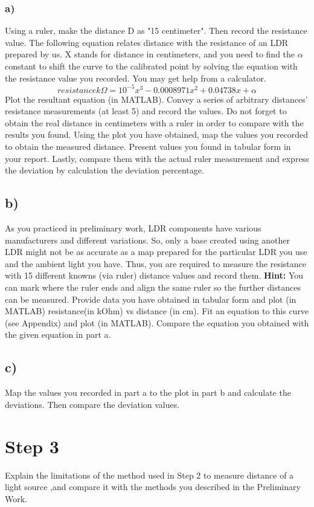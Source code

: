 \documentclass[letterpaper,12pt]{article}
\begin{document}
\subsubsection*{a)}
Using a ruler, make the distance D as "15 centimeter". Then record the resistance value. The following equation relates distance with the resistance of an LDR prepared by us. X stands for distance in centimeters, and you need to find the \(\alpha\) constant to shift the curve to the calibrated point by solving the equation with the resistance value you recorded. You may get help from a calculator.
\[resistance   k\Omega = 10^{-5} x^3 -0.0008971 x^2 + 0.04738x + \alpha\] 
Plot the resultant equation (in MATLAB). Convey a series of arbitrary distances' resistance measurements (at least 5) and record the values. Do not forget to obtain the real distance in centimeters with a ruler in order to compare with the results you found. Using the plot you have obtained, map the values you recorded to obtain the measured distance. Present values you found in tabular form in your report. Lastly, compare them with the actual ruler measurement and express the deviation by calculation the deviation percentage.\\
\subsection*{b)}
As you practiced in preliminary work, LDR components have various manufacturers and different variations. So, only a base created using another LDR might not be as accurate as a map prepared for the particular LDR you use and the ambient light you have. Thus, you are required to measure the resistance with 15 different knowns (via ruler) distance values and record them. \textbf{Hint:} You can mark where the ruler ends and align the same ruler so the further distances can be measured. Provide data you have obtained in tabular form and plot (in MATLAB) resistance(in kOhm) vs distance (in cm). Fit an equation to this curve (see Appendix) and plot (in MATLAB). Compare the equation you obtained with the given equation in part a. 
\subsection*{c)}
Map the values you recorded in part a to the plot in part b and calculate the deviations. Then compare the deviation values.
\section*{Step 3} 
Explain the limitations of the method used in Step 2 to measure distance of a light source ,and compare it with the methods you described in the Preliminary Work.
\end{document}
